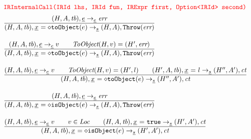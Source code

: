 \[
\begin{array}{l@{~~}l@{~~}ll}
\mtt{\normalsize\inred IRInternalCall(IRId lhs, IRId fun, IRExpr first, Option<IRId> second)}\\[.5em]

\frac{\begin{matrix}
\evale, \ir{\expr} \rightarrow_{\ir\expr} \err
\end{matrix}}{\begin{matrix}
\state, \irid \ {\tt = {\diamond}toObject}(e)  \rightarrow_{\ir\stmt} \res, \error
\end{matrix}}
\\[2em]

\frac{\begin{matrix}
\evale, \ir{\expr} \rightarrow_{\ir\expr} v
\rulesep
\hf{ToObject}(H,v) = (H',\err)
\end{matrix}}{\begin{matrix}
\state, \irid \ {\tt = {\diamond}toObject}(e)  \rightarrow_{\ir\stmt} \res, \error
\end{matrix}}
\\[2em]

\frac{\begin{matrix}
\evale, \ir{\expr} \rightarrow_{\ir\expr} v
\rulesep
\hf{ToObject}(H,v) = (H',l)
\rulesep
(H',A,\tb), \irid \ {\tt =} \ l \rightarrow_{\ir\stmt} (H'',A'), \ct
\end{matrix}}{\begin{matrix}
\state, \irid \ {\tt = {\diamond}toObject}(e)  \rightarrow_{\ir\stmt} (H'',A'), \ct
\end{matrix}}
\\[2em]

\frac{\begin{matrix}
\evale, \ir{\expr} \rightarrow_{\ir\expr} \err
\end{matrix}}{\begin{matrix}
\state, \irid \ {\tt = {\diamond}isObject}(e)  \rightarrow_{\ir\stmt} \res, \error
\end{matrix}}
\\[2em]

\frac{\begin{matrix}
\evale, \ir{\expr} \rightarrow_{\ir\expr} v
\rulesep
v\in\Loc
\rulesep
\state, \irid \ {\tt =} \ \true \rightarrow_{\ir\stmt} \resp, \ct
\end{matrix}}{\begin{matrix}
\state, \irid \ {\tt = {\diamond}isObject}(e)  \rightarrow_{\ir\stmt} \resp, \ct
\end{matrix}}
\\[2em]


\end{array}\]
